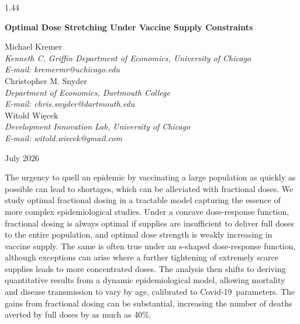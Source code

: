 \documentclass[12pt]{article}
\newcommand{\covid}{Covid-19}
\newcommand{\Wiecek}{Wi\k{e}cek}
\begin{document}
\begin{spacing}{1.44}

\begin{titlepage}
\singlespace

\begin{center}
{\large \bf Optimal Dose Stretching Under Vaccine Supply Constraints}
\end{center}

\vspace{2ex}

{\flushleft
Michael Kremer\\
{\em Kenneth C. Griffin Department of Economics, University of Chicago\\ 
E-mail: kremermr@uchicago.edu}\\[2ex]
Christopher M. Snyder\\
{\em Department of Economics, Dartmouth College\\
E-mail: chris.snyder@dartmouth.edu}\\[2ex]
Witold \Wiecek\\
{\em Development Innovation Lab, University of Chicago\\
E-mail: witold.wiecek@gmail.com}}

\vspace{2ex}

\begin{center}
July 2026
\end{center}

\vspace{2ex}

 The urgency to quell an epidemic by
vaccinating a large population as quickly as possible can lead to
shortages, which can be alleviated with fractional doses. We study
optimal fractional dosing in a tractable model capturing the essence
of more complex epidemiological studies. Under a concave dose-response
function, fractional dosing is always optimal if supplies are
insufficient to deliver full doses to the entire population, and
optimal dose strength is weakly increasing in vaccine supply. The same
is often true under an s-shaped dose-response function, although
exceptions can arise where a further tightening of extremely scarce
supplies leads to more concentrated doses. The analysis then shifts to
deriving quantitative results from a dynamic epidemiological model,
allowing mortality and disease transmission to vary by age, calibrated
to \covid\ parameters. The gains from fractional dosing can be
substantial, increasing the number of deaths averted by full doses by
as much as 40\%.


\end{titlepage}
\end{spacing}
\end{document}
